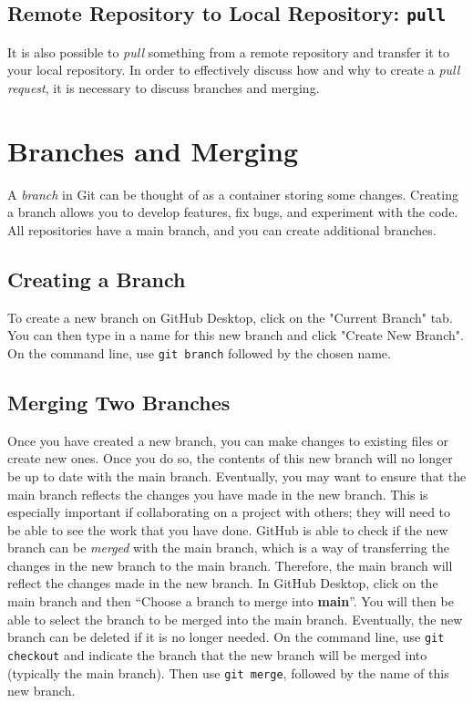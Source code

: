\documentclass[10pt,twocolumn]{article}
\begin{document}
\subsection{Remote Repository to Local Repository: \texttt{pull}}

It is also possible to \textit{pull} something from a remote repository and transfer it to your local repository. In order to effectively discuss how and why to create a \textit{pull request}, it is necessary to discuss branches and merging.

\section{Branches and Merging}

A \textit{branch} in Git can be thought of as a container storing some changes. Creating a branch allows you to develop features, fix bugs, and experiment with the code. All repositories have a main branch, and you can create additional branches.

\subsection{Creating a Branch}

To create a new branch on GitHub Desktop, click on the "Current Branch" tab. You can then type in a name for this new branch and click "Create New Branch". On the command line, use \texttt{git branch} followed by the chosen name.

\subsection{Merging Two Branches}

Once you have created a new branch, you can make changes to existing files or create new ones. Once you do so, the contents of this new branch will no longer be up to date with the main branch. Eventually, you may want to ensure that the main branch reflects the changes you have made in the new branch. This is especially important if collaborating on a project with others; they will need to be able to see the work that you have done. GitHub is able to check if the new branch can be \textit{merged} with the main branch, which is a way of transferring the changes in the new branch to the main branch. Therefore, the main branch will reflect the changes made in the new branch. In GitHub Desktop, click on the main branch and then “Choose a branch to merge into \textbf{main}”. You will then be able to select the branch to be merged into the main branch. Eventually, the new branch can be deleted if it is no longer needed. On the command line, use \texttt{git checkout} and indicate the branch that the new branch will be merged into (typically the main branch). Then use \texttt{git merge}, followed by the name of this new branch.
\end{document}
